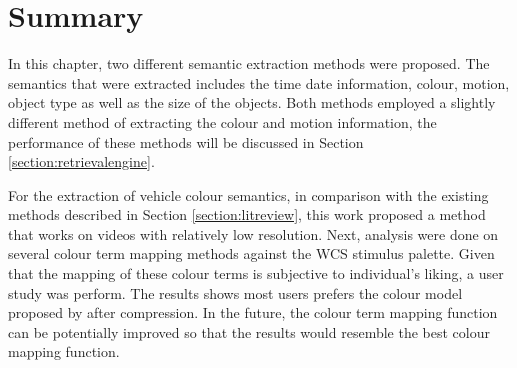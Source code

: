 \section{Summary}
In this chapter, two different semantic extraction methods were proposed. The semantics that were extracted includes the time date information, colour, motion, object type as well as the size of the objects. Both methods employed a slightly different method of extracting the colour and motion information, the performance of these methods will be discussed in Section \ref{section:retrievalengine}. 

For the extraction of vehicle colour semantics, in comparison with the existing methods described in Section \ref{section:litreview}, this work proposed a method that works on videos with relatively low resolution. Next, analysis were done on several colour term mapping methods against the WCS stimulus palette. Given that the mapping of these colour terms is subjective to individual's liking, a user study was perform. The results shows most users prefers the colour model proposed by  after compression.
In the future, the colour term mapping function can be potentially improved so that the results would resemble the best colour mapping function. 

